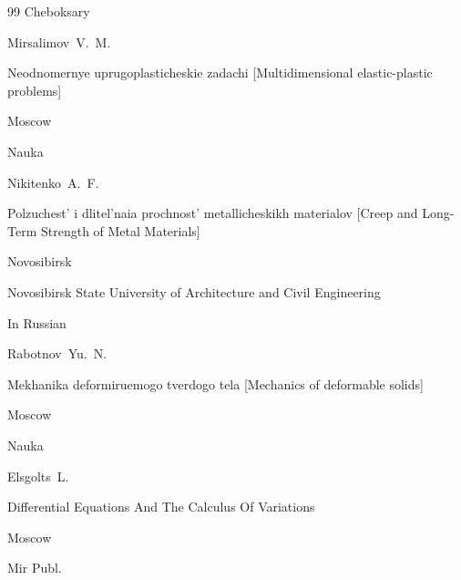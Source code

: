 \begin{thebibliography}{99}
\publaddr Cheboksary











\by Mirsalimov~V.~M.

\book Neodnomernye uprugoplasticheskie zadachi \rm [Multidimensional elastic-plastic problems]

\publaddr Moscow

\publ Nauka







\by Nikitenko~A.~F.

\book Polzuchest' i dlitel'naia prochnost' metallicheskikh materialov \rm [Creep and Long-Term Strength of Metal Materials]

\publaddr Novosibirsk

\publ Novosibirsk State University of Architecture and Civil Engineering








\lang In Russian

\by Rabotnov~Yu.~N.

\book Mekhanika deformiruemogo tverdogo tela \rm [Mechanics of deformable solids]

\publaddr Moscow

\publ Nauka








\by Elsgolts~L.

\book Differential Equations And The Calculus Of Variations 


\publaddr Moscow

\publ Mir Publ.


\end{thebibliography}
